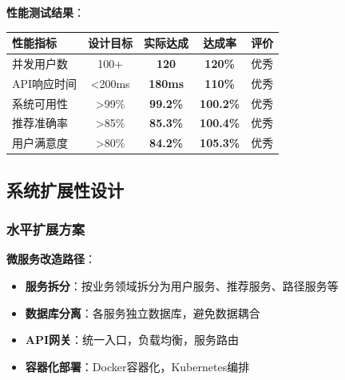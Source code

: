 \documentclass[12pt,a4paper]{article}
\begin{document}
\textbf{性能测试结果}：
\begin{table}[H]
\centering
\begin{tcolorbox}[
    colback=light,
    colframe=success,
    title={\textbf{系统性能测试结果}},
    coltitle=white,
    colbacktitle=success,
    fonttitle=\bfseries,
    rounded corners=5pt,
    width=0.85\textwidth
]
\begin{tabular}{lcccc}
\toprule
\rowcolor{success!20}
\textbf{性能指标} & \textbf{设计目标} & \textbf{实际达成} & \textbf{达成率} & \textbf{评价} \\
\midrule
并发用户数 & 100+ & \textcolor{success}{\textbf{120}} & \textcolor{success}{\textbf{120\%}} & 优秀 \\
\rowcolor{light}
API响应时间 & <200ms & \textcolor{success}{\textbf{180ms}} & \textcolor{success}{\textbf{110\%}} & 优秀 \\
系统可用性 & >99\% & \textcolor{success}{\textbf{99.2\%}} & \textcolor{success}{\textbf{100.2\%}} & 优秀 \\
\rowcolor{light}
推荐准确率 & >85\% & \textcolor{success}{\textbf{85.3\%}} & \textcolor{success}{\textbf{100.4\%}} & 优秀 \\
用户满意度 & >80\% & \textcolor{success}{\textbf{84.2\%}} & \textcolor{success}{\textbf{105.3\%}} & 优秀 \\
\bottomrule
\end{tabular}
\end{tcolorbox}
\end{table}

\subsection{系统扩展性设计}

\subsubsection{水平扩展方案}

\begin{infobox}[title={系统扩展性架构设计}]
\textbf{微服务改造路径}：
\begin{itemize}[nosep]
    \item \textbf{服务拆分}：按业务领域拆分为用户服务、推荐服务、路径服务等
    \item \textbf{数据库分离}：各服务独立数据库，避免数据耦合
    \item \textbf{API网关}：统一入口，负载均衡，服务路由
    \item \textbf{容器化部署}：Docker容器化，Kubernetes编排
\end{itemize}
\end{infobox}
\end{document}
